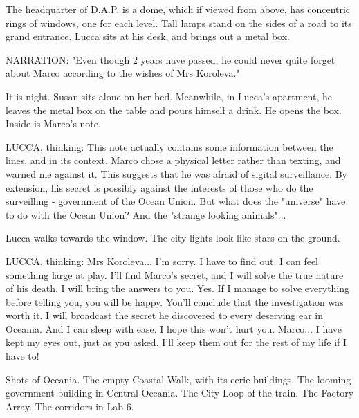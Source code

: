 \documentclass[11pt]{article}
\begin{document}
The headquarter of D.A.P. is a dome, which if viewed from above, has concentric rings of windows, one for each level. 
Tall lamps stand on the sides of a road to its grand entrance. 
Lucca sits at his desk, and brings out a metal box. 

NARRATION: "Even though 2 years have passed, he could never quite forget about Marco according to the wishes of Mrs Koroleva."

It is night. Susan sits alone on her bed. 
Meanwhile, in Lucca's apartment, he leaves the metal box on the table and pours himself a drink. 
He opens the box. Inside is Marco's note. 

LUCCA, thinking: This note actually contains some information between the lines, and in its context. 
Marco chose a physical letter rather than texting, and warned me against it. 
This suggests that he was afraid of sigital surveillance. 
By extension, his secret is possibly against the interests of those who do the surveilling - government of the Ocean Union. 
But what does the "universe" have to do with the Ocean Union?
And the "strange looking animals"... 

Lucca walks towards the window. The city lights look like stars on the ground. 

LUCCA, thinking: 
Mrs Koroleva... I'm sorry. I have to find out. I can feel something large at play. 
I'll find Marco's secret, and I will solve the true nature of his death. 
I will bring the answers to you. Yes. 
If I manage to solve everything before telling you, you will be happy. 
You'll conclude that the investigation was worth it. 
I will broadcast the secret he discovered to every deserving ear in Oceania.
And I can sleep with ease. 
I hope this won't hurt you. 
Marco... I have kept my eyes out, just as you asked. I'll keep them out for the rest of my life if I have to!

Shots of Oceania. 
The empty Coastal Walk, with its eerie buildings. 
The looming government building in Central Oceania. 
The City Loop of the train. 
The Factory Array.
The corridors in Lab 6.
\end{document}

